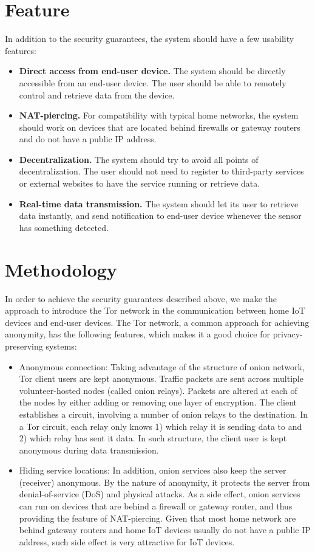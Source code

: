 \section{Feature}
In addition to the security guarantees, the system should have a few usability features:

\begin{itemize}
	\item \textbf{Direct access from end-user device.} The system should be directly accessible from an end-user device. The user should be able to remotely control and retrieve data from the device.
	\item \textbf{NAT-piercing.}  For compatibility with typical home networks, the system should work on devices that are located behind firewalls or gateway routers and do not have a public IP address.
	\item \textbf{Decentralization.} The system should try to avoid all points of decentralization. The user should not need to register to third-party services or external websites to have the service running or retrieve data.
	\item \textbf{Real-time data transmission.} The system should let its user to retrieve data instantly, and send notification to end-user device whenever the sensor has something detected.
\end{itemize}



\section{Methodology}
In order to achieve the security guarantees described above, we make the approach to introduce the Tor network in the communication between home IoT devices and end-user devices. The Tor network, a common approach for achieving anonymity\cite{dingledine2004tor}, has the following features, which makes it a good choice for privacy-preserving systems:

\begin{itemize}
	\item Anonymous connection: Taking advantage of the structure of onion network, Tor client users are kept anonymous. Traffic packets are sent across multiple volunteer-hosted nodes (called onion relays). Packets are altered at each of the nodes by either adding or removing one layer of encryption. The client establishes a circuit, involving a number of onion relays to the destination. In a Tor circuit, each relay only knows 1) which relay it is sending data to and 2) which relay has sent it data. In such structure, the client user is kept anonymous during data transmission. 
	\item Hiding service locations: In addition, onion services also keep the server (receiver) anonymous. By the nature of anonymity, it protects the server from denial-of-service (DoS) and physical attacks. As a side effect, onion services can run on devices that are behind a firewall or gateway router, and thus providing the feature of NAT-piercing. Given that most home network are behind gateway routers and home IoT devices usually do not have a public IP address, such side effect is very attractive for IoT devices.
\end{itemize}